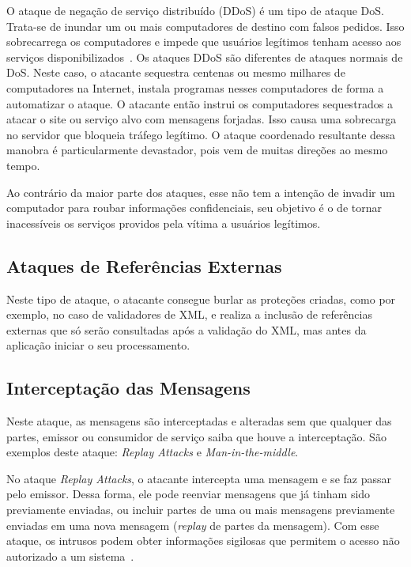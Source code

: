 O ataque de negação de serviço distribuído (DDoS) é um tipo de ataque DoS. Trata-se de inundar um ou mais computadores de destino com falsos pedidos. Isso sobrecarrega os computadores e impede que usuários legítimos tenham acesso aos serviços disponibilizados~\cite{kim2010fundamentals}.
Os ataques DDoS são diferentes de ataques normais de DoS. Neste caso, o atacante sequestra centenas ou mesmo milhares de computadores na Internet, instala programas nesses computadores de forma a automatizar o ataque. O atacante então instrui os computadores sequestrados a atacar o site ou serviço alvo com mensagens forjadas. Isso causa uma sobrecarga no servidor que bloqueia tráfego legítimo. O ataque coordenado resultante dessa manobra é particularmente devastador,  pois vem de muitas direções ao mesmo tempo.

Ao contrário da maior parte dos ataques, esse não tem a intenção de invadir um computador para roubar informações confidenciais, seu objetivo é o de tornar inacessíveis os serviços providos pela vítima a usuários legítimos.

\subsection{Ataques de Referências Externas}

Neste tipo de ataque, o atacante consegue burlar as proteções criadas, como por exemplo, no caso de validadores de XML, e realiza a inclusão de referências externas que só serão consultadas após a validação do XML, mas antes da aplicação iniciar o seu processamento.

\subsection{Interceptação das Mensagens}

Neste ataque, as mensagens são interceptadas e alteradas sem que qualquer das partes, emissor ou consumidor de serviço saiba que houve a interceptação. São exemplos deste ataque: \emph{Replay Attacks} e \emph{Man-in-the-middle}.

No ataque \emph{Replay Attacks}, o atacante intercepta uma mensagem  e se faz passar pelo emissor. Dessa forma, ele pode reenviar mensagens que já tinham sido previamente enviadas, ou incluir partes de uma ou mais mensagens previamente enviadas em uma nova mensagem (\emph{replay} de partes da mensagem). Com esse ataque, os intrusos podem obter informações sigilosas que permitem o acesso não autorizado a um sistema~\cite{kim2010fundamentals}.

